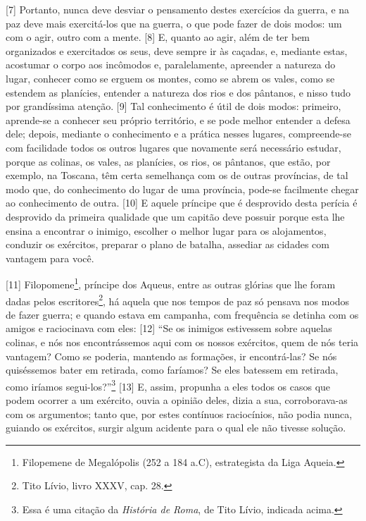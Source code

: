 {[}7{]} Portanto, nunca deve desviar o pensamento destes exercícios da
guerra, e na paz deve mais exercitá-los que na guerra, o que pode fazer
de dois modos: um com o agir, outro com a mente. {[}8{]} E, quanto ao
agir, além de ter bem organizados e exercitados os seus, deve sempre ir
às caçadas, e, mediante estas, acostumar o corpo aos incômodos e,
paralelamente, apreender a natureza do lugar, conhecer como se erguem os
montes, como se abrem os vales, como se estendem as planícies, entender
a natureza dos rios e dos pântanos, e nisso tudo por grandíssima
atenção. {[}9{]} Tal conhecimento é útil de dois modos: primeiro,
aprende-se a conhecer seu próprio território, e se pode melhor entender
a defesa dele; depois, mediante o conhecimento e a prática nesses
lugares, compreende-se com facilidade todos os outros lugares que
novamente será necessário estudar, porque as colinas, os vales, as
planícies, os rios, os pântanos, que estão, por exemplo, na Toscana, têm
certa semelhança com os de outras províncias, de tal modo que, do
conhecimento do lugar de uma província, pode-se facilmente chegar ao
conhecimento de outra. {[}10{]} E aquele príncipe que é desprovido desta
perícia é desprovido da primeira qualidade que um capitão deve possuir
porque esta lhe ensina a encontrar o inimigo, escolher o melhor lugar
para os alojamentos, conduzir os exércitos, preparar o plano de batalha,
assediar as cidades com vantagem para você.

{[}11{]} Filopomene\footnote{Filopemene de Megalópolis (252 a 184 a.C),
  estrategista da Liga Aqueia.}, príncipe dos Aqueus, entre as outras
glórias que lhe foram dadas pelos escritores\footnote{Tito Lívio, livro
  XXXV, cap. 28.}, há aquela que nos tempos de paz só pensava nos modos
de fazer guerra; e quando estava em campanha, com frequência se detinha
com os amigos e raciocinava com eles: {[}12{]} ``Se os inimigos
estivessem sobre aquelas colinas, e nós nos encontrássemos aqui com os
nossos exércitos, quem de nós teria vantagem? Como se poderia, mantendo
as formações, ir encontrá-las? Se nós quiséssemos bater em retirada,
como faríamos? Se eles batessem em retirada, como iríamos
segui-los?''\footnote{Essa é uma citação da \emph{História de Roma}, de
  Tito Lívio, indicada acima.} {[}13{]} E, assim, propunha a eles todos
os casos que podem ocorrer a um exército, ouvia a opinião deles, dizia a
sua, corroborava-as com os argumentos; tanto que, por estes contínuos
raciocínios, não podia nunca, guiando os exércitos, surgir algum
acidente para o qual ele não tivesse solução.

